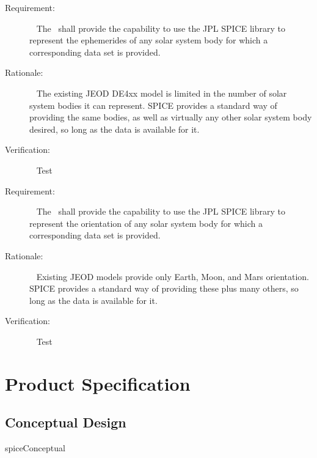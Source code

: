 \label{reqt:rep_ephem}
\begin{description}
\item[Requirement:]\ \newline
  The \SpiceDesc\ shall provide the capability to use the JPL SPICE library
  to represent the ephemerides of any solar system body for which a
  corresponding data set is provided.

\item[Rationale:]\ \newline
  The existing JEOD DE4xx model is limited in the number of solar system bodies
  it can represent. SPICE provides a standard way of providing the same bodies,
  as well as virtually any other solar system body desired, so long as the data
  is available for it.

\item[Verification:]\ \newline
  Test
\end{description}


\label{reqt:rep_rnp}
\begin{description}
\item[Requirement:]\ \newline
  The \SpiceDesc\ shall provide the capability to use the JPL SPICE library
  to represent the orientation of any solar system body for which a
  corresponding data set is provided.

\item[Rationale:]\ \newline
  Existing JEOD models provide only Earth, Moon, and Mars orientation. SPICE
  provides a standard way of providing these plus many others, so long as the
  data is available for it.

\item[Verification:]\ \newline
  Test
\end{description}


\chapter{Product Specification}\label{ch:spec}

\section{Conceptual Design}
 {spiceConceptual}

